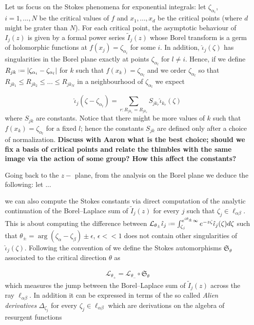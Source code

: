 \documentclass[11pt,a4paper,twoside,leqno,noamsfonts]{amsart}
\numberwithin{equation}{section}
\begin{document}
\color{black}

Let us focus on the Stokes phenomena for exponential integrals: let $\zeta_{\alpha_i}$, $i=1,...,N$ be the critical values of $f$ and $x_1,...,x_d$ be the critical points (where $d$ might be grater than $N$). For each critical point, the asymptotic behaviour of $I_{j}(z)$ is given by a formal power series $\tilde{I}_{j}(z)$ whose Borel transform is a germ of holomorphic functions at $f(x_j)=\zeta_{\alpha_i}$ for some $i$. In addition, $\hat{\iota}_{j}(\zeta)$ has singularities in the Borel plane exactly at points $\zeta_{\alpha_l}$ for $l\neq i$. Hence, if we define $R_{jk}\defeq |\zeta_{\alpha_i}-\zeta_{\alpha_l}|$ for $k$ such that $f(x_k)=\zeta_{\alpha_l}$ and we order $\zeta_{\alpha_l}$ so that $R_{jk_1}\leq R_{jk_2}\leq ...\leq R_{jk_N}$ in a neighbourhood of $\zeta_{\alpha_l}$ we expect  

\begin{equation}
\hat{\iota}_j(\zeta-\zeta_{\alpha_l})=\sum_{r: R_{jk_1}=R_{jk_r}}S_{jk_r}\hat{\iota}_{k_r}(\zeta) 
\end{equation}  
where $S_{jk}$ are constants. Notice that there might be more values of $k$ such that $f(x_k)=\zeta_{\alpha_l}$ for a fixed $l$; hence the constants $S_{jk}$ are defined only after a choice of normalization. \textbf{Discuss with Aaron what is the best choice; should we fix a basis of critical points and relate the thimbles with the same image via the action of some group? How this affect the constants?}   


Going back to the $z-$ plane, from the analysis on the Borel plane we deduce the following: let ...

we can also compute the Stokes constants via direct computation of the analytic continuation of the Borel--Laplace sum of $\tilde{I}_{j}(z)$ for every $j$ such that $\zeta_j\in\ell_{\alpha\beta}$. This is about computing the difference between $\mathcal{L}_{\theta_\pm}\hat{\iota}_{j}\defeq\int_{ 
\zeta_j}^{e^{i\theta_\pm}\infty}e^{-z\zeta}\hat{\iota}_{j}(\zeta)d\zeta$ such that $\theta_\pm=\arg(\zeta_\alpha-\zeta_\beta)\pm\epsilon$, $\epsilon <\!\!< 1$ does not contain other singularities of $\hat{\iota}_j(\zeta)$. Following the convention of \cite{Dorigoni}\cite{Schiappa} we define the Stokes automorphisms $\mathfrak{S}_\theta$ associated to the critical direction $\theta$ as 

\begin{align*}
\mathcal{L}_{\theta_+}=\mathcal{L}_{\theta_-}\circ\mathfrak{S}_{\theta}
\end{align*}
which measures the jump between the Borel--Laplace sum of $\tilde{I}_j(z)$ across the ray $\ell_{\alpha\beta}$. In addition it can be expressed in terms of the so called \textit{Alien derivatives} $\Delta_{\zeta_{j}}$ for every $\zeta_{j}\in\ell_{\alpha\beta}$ which are derivations on the algebra of resurgent functions
\end{document}
